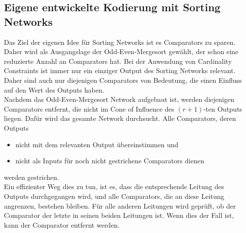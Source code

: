 \documentclass[a4,abstract=on]{scrartcl}
\begin{document}
	\subsection{Eigene entwickelte Kodierung mit Sorting Networks}
Das Ziel der eigenen Idee für Sorting Networks ist es Comparators zu sparen. Daher wird als Ausgangslage der Odd-Even-Mergesort gewählt, der schon eine reduzierte Anzahl an Comparators hat. Bei der Anwendung von Cardinality Constraints ist immer nur ein einziger Output des Sorting Networks relevant. Daher sind auch nur diejenigen Comparators von Bedeutung, die einen Einfluss auf den Wert des Outputs haben.\\
Nachdem das Odd-Even-Mergesort Network aufgebaut ist, werden diejenigen Comparators entfernt, die nicht im Cone of Influence des $(r+1)$-ten Outputs liegen. Dafür wird das gesamte Network durchsucht. Alle Comparators, deren Outputs
\begin{itemize}
\item nicht mit dem relevanten Output übereinstimmen und
\item nicht als Inputs für noch nicht gestrichene Comparators dienen
\end{itemize}
werden gestrichen. \\
Ein effizienter Weg dies zu tun, ist es, dass die entsprechende Leitung des Outputs durchgegangen wird, und alle Comparators, die an diese Leitung angrenzen, bestehen bleiben. Für alle anderen Leitungen wird geprüft, ob der Comparator der letzte in seinen beiden Leitungen ist. Wenn dies der Fall ist, kann der Comparator entfernt werden.

\end{document}
